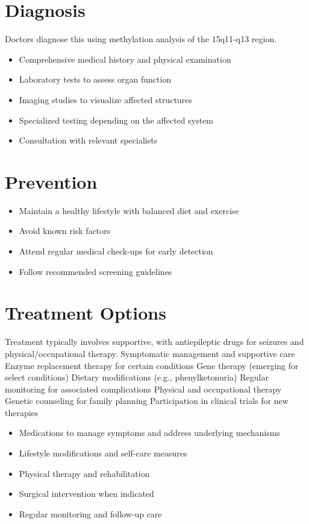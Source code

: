 \section{Diagnosis}
Doctors diagnose this using methylation analysis of the 15q11-q13 region.

\begin{itemize}[noitemsep]
  \item Comprehensive medical history and physical examination
  \item Laboratory tests to assess organ function
  \item Imaging studies to visualize affected structures
  \item Specialized testing depending on the affected system
  \item Consultation with relevant specialists
\end{itemize}
\section{Prevention}
\begin{itemize}[noitemsep]
  \item Maintain a healthy lifestyle with balanced diet and exercise
  \item Avoid known risk factors
  \item Attend regular medical check-ups for early detection
  \item Follow recommended screening guidelines
\end{itemize}
\section{Treatment Options}
Treatment typically involves supportive, with antiepileptic drugs for seizures and physical/occupational therapy. Symptomatic management and supportive care Enzyme replacement therapy for certain conditions Gene therapy (emerging for select conditions) Dietary modifications (e.g., phenylketonuria) Regular monitoring for associated complications Physical and occupational therapy Genetic counseling for family planning Participation in clinical trials for new therapies

\begin{itemize}[noitemsep]
  \item Medications to manage symptoms and address underlying mechanisms
  \item Lifestyle modifications and self-care measures
  \item Physical therapy and rehabilitation
  \item Surgical intervention when indicated
  \item Regular monitoring and follow-up care
\end{itemize}
